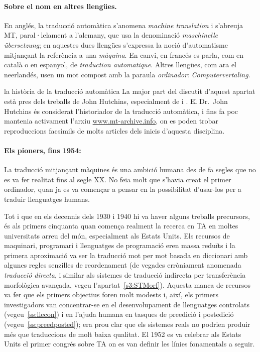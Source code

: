 \paragraph{Sobre el nom en altres llengües.}
En anglés, la traducció automàtica s'anomena \emph{machine
  translation} i s'abreuja MT, paral·lelament a l'alemany, que usa la
denominació \emph{maschinelle übersetzung}; en aquestes dues llengües
s'expressa la noció d'automatisme mitjançant la referència a una {\em
  màquina}. En canvi, en francés es parla, com en català o en
espanyol, de {\em traduction automatique}. Altres llengües, com ara el
neerlandés, usen un mot compost amb la paraula \emph{ordinador}:
\emph{Computervertaling}.

\begin{persabermes}{la història de la traducció automàtica}
  La major part del discutit d'aquest apartat està pres dels treballs
  de John Hutchins, especialment de \cite{hutchins1995} i
  \cite{hutchins2001}. El Dr.\ John Hutchins és considerat
  l'historiador de la traducció automàtica, i fins fa poc mantenia
  activament l'arxiu \url{www.mt-archive.info}, on es poden trobar
  reproduccions facsímils de molts articles dels inicis d'aquesta
  disciplina.

  \paragraph{Els pioners, fins 1954:} La traducció mitjançant màquines
  és una ambició humana des de fa segles que no es va fer realitat
  fins al segle XX. No feia molt que s'havia creat el primer
  ordinador, quan ja es va començar a pensar en la possibilitat
  d'usar-los per a traduir llenguatges humans.

  Tot i que en els decennis dels 1930 i 1940 hi va haver alguns
  treballs precursors, és als primers cinquanta quan comença realment
  la recerca en TA en moltes universitats arreu del món, especialment
  als Estats Units. Els recursos de maquinari, programari i
  llenguatges de programació eren massa reduïts i la primera
  aproximació va ser la traducció mot per mot basada en diccionari amb
  algunes regles senzilles de reordenament (de vegades erròniament
  anomenada \emph{traducció directa}, i similar als sistemes de
  traducció indirecta per transferència morfològica avançada, vegeu
  l'apartat~\ref{s3:STMorf}). Aquesta manca de recursos va fer que els
  primers objectius foren molt modests i, així, els primers
  investigadors van concentrar-se en el desenvolupament de llenguatges
  controlats (vegeu~\ref{ss:llecon}) i en l'ajuda humana en tasques de
  preedició i postedició (vegeu~\ref{ss:preedposted}); era prou clar
  que els sistemes reals no podrien produir més que traduccions de
  molt baixa qualitat.  El 1952 es va celebrar als Estats Units el
  primer congrés sobre TA on es van definir les línies fonamentals a
  seguir.


\end{persabermes}
